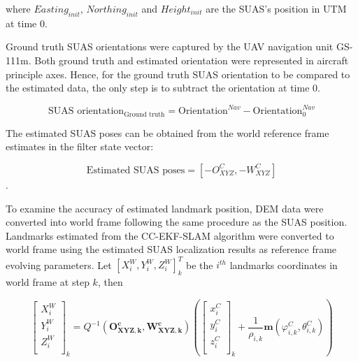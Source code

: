 \noindent where $Easting_{init}$, $Northing_{init}$ and
$Height_{init}$ are the SUAS's position in UTM at time 0. 

Ground truth SUAS orientations were captured by the UAV navigation
unit GS-111m. Both ground truth and estimated orientation were
represented in aircraft principle axes. Hence, for the ground truth
SUAS orientation to be compared to the estimated data, the only step
is to subtract the orientation at time 0.

$$\text{SUAS orientation}_{\text{Ground truth}} =
\text{Orientation}^{Nav} - \text{Orientation}^{Nav}_0$$

The estimated SUAS poses can be obtained from the world reference
frame estimates in the filter state vector:

$$ \text{Estimated SUAS poses} = 
[-O_{XYZ}^{C}, -W_{XYZ}^{C}]$$.


To examine the accuracy of estimated landmark position, DEM data were
converted into world frame following the same procedure as the SUAS
position. Landmarks estimated from the CC-EKF-SLAM algorithm were
converted to world frame using the estimated SUAS localization results
as reference frame evolving parameters. Let $[X_i^W,Y_i^W,
Z_i^W]^T_k$ be the $i^{th}$ landmarks coordinates in world frame at
step $k$, then

\begin{equation}
  \left[ \begin{array}{c}
    X_{i}^{W}  \\
    Y_{i}^{W}  \\
    Z_{i}^{W}  \\
  \end{array} \right]_k=Q^{-1}(\mathbf{O_{XYZ, k}^{c}}, \mathbf{W_{XYZ,k}^{c}})\left(\left[
    \begin{array}{c}
      x_{i}^{C} \\
      y_{i}^{C} \\
      z_{i}^{C} \\
    \end{array}
  \right]_k+\frac{1}{\rho _{i,k}}\mathbf{m}(\varphi_{i,k}^{C},\theta_{i,k}^{C})\right)
\end{equation}

